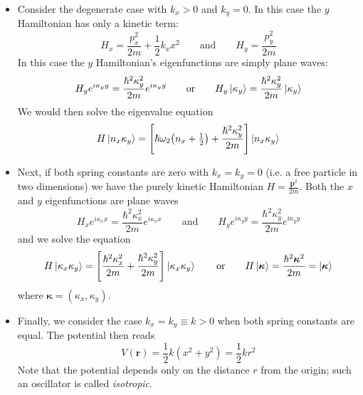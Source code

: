 \documentclass[11pt, a4paper]{article}
\newcommand{\eqtext}[1]{\qquad \text{#1} \qquad}
\renewcommand{\vec}[1]{\bm{#1}} %
\begin{document}
\begin{itemize}
	\item Consider the degenerate case with $ k_{x} > 0 $ and $ k_{y} = 0 $. In this case the $ y $ Hamiltonian has only a kinetic term:
	\begin{equation*}
		H_{x} = \frac{p_{x}^{2}}{2m} + \frac{1}{2}k_{x}x^{2} \eqtext{and} H_{y} = \frac{p_{y}^{2}}{2m}
	\end{equation*}
	In this case the $ y $ Hamiltonian's eigenfunctions are simply plane waves:
	\begin{equation*}
		H_{y}e^{i\kappa_{y}y} = \frac{\hbar^{2}\kappa_{y}^{2}}{2m}e^{i\kappa_{y}y} \eqtext{or} H_{y}\ket{\kappa_{y}} = \frac{\hbar^{2}\kappa_{y}^{2}}{2m}\ket{\kappa_{y}}
	\end{equation*}
	We would then solve the eigenvalue equation
	\begin{equation*}
		H\ket{n_{x}\kappa_{y}} = \left[\hbar \omega_{2}\big(n_{x} + \tfrac{1}{2}\big) + \frac{\hbar^{2}\kappa_{y}^{2}}{2m}\right]\ket{n_{x}\kappa_{y}}
	\end{equation*}
	
	\item Next, if both spring constants are zero with $ k_{x} = k_{y} = 0 $ (i.e. a free particle in two dimensions) we have the purely kinetic Hamiltonian $ H = \frac{\vec{p}^{2}}{2m} $. Both the $ x $ and $ y $ eigenfunctions are plane waves
	\begin{equation*}
		H_{x}e^{i\kappa_{x}x} = \frac{\hbar^{2}\kappa_{x}^{2}}{2m}e^{i\kappa_{x}x} \eqtext{and} H_{y}e^{i\kappa_{y}y} = \frac{\hbar^{2}\kappa_{y}^{2}}{2m}e^{i\kappa_{y}y}
	\end{equation*}
	and we solve the equation 
	\begin{equation*}
		H\ket{\kappa_{x}\kappa_{y}} = \left[\frac{\hbar^{2}\kappa_{x}^{2}}{2m} + \frac{\hbar^{2}\kappa_{y}^{2}}{2m}\right]\ket{\kappa_{x}\kappa_{y}} \eqtext{or} H\ket{\vec{\kappa}} = \frac{\hbar^{2}\vec{\kappa}^{2}}{2m} = \ket{\vec{\kappa}}
	\end{equation*}
	where $ \vec{\kappa} = (\kappa_{x}, \kappa_{y}) $.
	
	\item Finally, we consider the case $ k_{x} = k_{y} \equiv k > 0 $ when both spring constants are equal. The potential then reads
	\begin{equation*}
		V(\vec{r}) = \frac{1}{2}k(x^{2} + y^{2}) = \frac{1}{2}kr^{2}
	\end{equation*}
	Note that the potential depends only on the distance $ r $ from the origin; such an oscillator is called \textit{isotropic}. 
	

\end{itemize}
\end{document}
